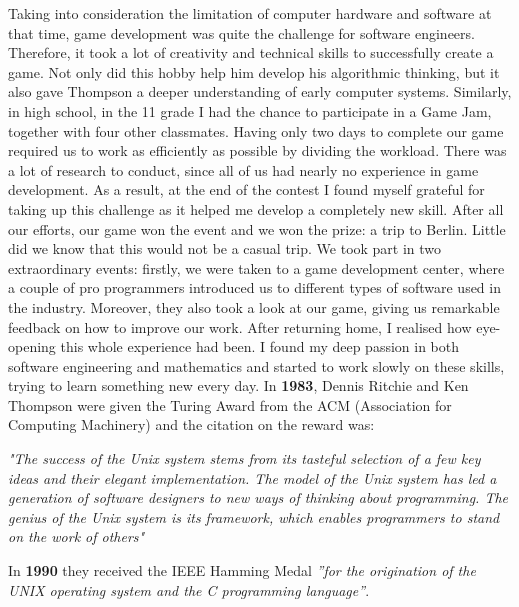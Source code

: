\documentclass[12pt]{article}
\newcommand\textss[1]{\stackengine{.9ex}{}{\scriptsize#1}{O}{l}{F}{F}{L}}
\begin{document}
Taking into consideration the limitation of computer hardware and software at that time, game development was quite the challenge for software engineers. Therefore, it took a lot of creativity and technical skills to successfully create a game. Not only did this hobby help him develop his algorithmic thinking, but it also gave Thompson a deeper understanding of early computer systems.\newline\newline
Similarly, in high school, in the 11\textss{th} grade I had the chance to participate in a Game Jam, together with four other classmates. Having only two days to complete our game required us to work as efficiently as possible by dividing the workload. There was a lot of research to conduct, since all of us had nearly no experience in game development. As a result, at the end of the contest I found myself grateful for taking up this challenge as it helped me develop a completely new skill. After all our efforts, our game won the event and we won the prize: a trip to Berlin. Little did we know that this would not be a casual trip. We took part in two extraordinary events: firstly, we were taken to a game development center, where a couple of pro programmers introduced us to different types of software used in the industry.  Moreover,  they also took a look at our game,  giving us remarkable feedback on how to improve our work. After returning home, I realised how eye-opening this whole experience had been. I found my deep passion in both software engineering and mathematics and started to work slowly on these skills, trying to learn something new every day.\newline\newline
In \textbf{1983}, Dennis Ritchie and Ken Thompson were given the Turing Award from the ACM (Association for Computing Machinery) and the citation on the reward was:
\begin{center}
    \footnotesize \textit{"The success of the Unix system stems from its tasteful selection of a few key ideas and their elegant implementation. The model of the Unix system has led a generation of software designers to new ways of thinking about programming. The genius of the Unix system is its framework, which enables programmers to stand on the work of others"}
\end{center}
In \textbf{1990} they received the IEEE Hamming Medal \textit{”for the origination of the UNIX operating system and the C programming language”}.\newline\newline
\end{document}
